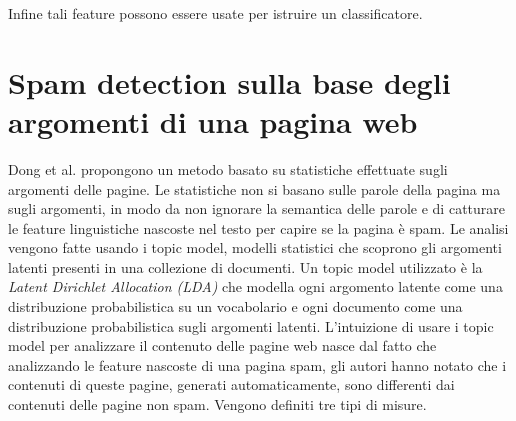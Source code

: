 Infine tali feature possono essere usate per istruire un classificatore.

\section{Spam detection sulla base degli argomenti di una pagina web}
Dong et al. \cite{Dong:2012:EDC:2457524.2457693} propongono un metodo basato su statistiche effettuate sugli argomenti delle pagine. Le statistiche non si basano sulle parole della pagina ma sugli argomenti, in modo da non ignorare la semantica delle parole e di catturare le feature linguistiche nascoste nel testo per capire se la pagina è spam. Le analisi vengono fatte usando i topic model, modelli statistici che scoprono gli argomenti latenti presenti in una collezione di documenti. Un topic model utilizzato è la \textit{Latent Dirichlet Allocation (LDA)} che modella ogni argomento latente come una distribuzione probabilistica su un vocabolario e ogni documento come una distribuzione probabilistica sugli argomenti latenti. L'intuizione di usare i topic model per analizzare il contenuto  delle pagine web nasce dal fatto che analizzando le feature nascoste di una pagina spam, gli autori hanno notato che i contenuti di queste pagine, generati automaticamente, sono differenti dai contenuti delle pagine non 
spam. Vengono definiti tre tipi di misure.

